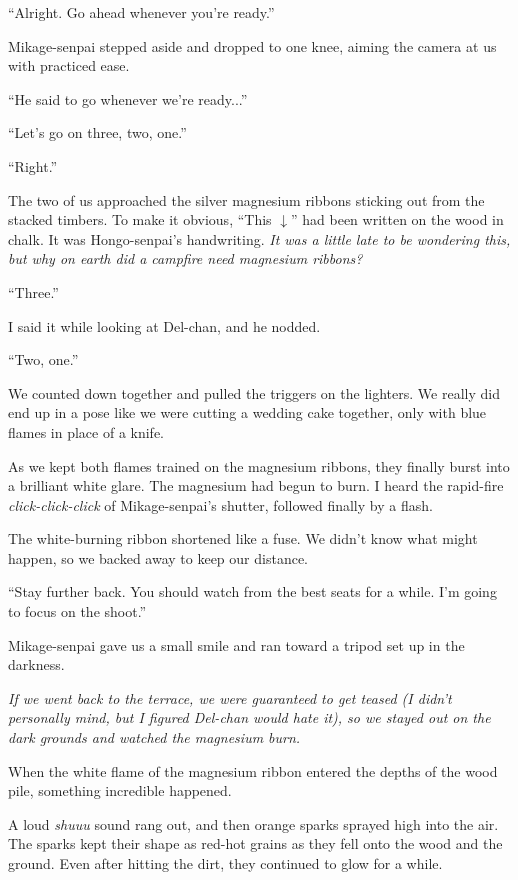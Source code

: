 \documentclass[
    a4paper,
    12pt,
    twoside,
    openany,
    UTF8,
    fontset=windows
]{ctexbook}
\begin{document}
``Alright. Go ahead whenever you're ready.''

Mikage-senpai stepped aside and dropped to one knee, aiming the camera at us with practiced ease.

``He said to go whenever we're ready...''

``Let's go on three, two, one.''

``Right.''

The two of us approached the silver magnesium ribbons sticking out from the stacked timbers. To make it obvious, ``This $\downarrow$'' had been written on the wood in chalk. It was Hongo-senpai's handwriting. \textit{It was a little late to be wondering this, but why on earth did a campfire need magnesium ribbons?}

``Three.''

I said it while looking at Del-chan, and he nodded.

``Two, one.''

We counted down together and pulled the triggers on the lighters. We really did end up in a pose like we were cutting a wedding cake together, only with blue flames in place of a knife.

As we kept both flames trained on the magnesium ribbons, they finally burst into a brilliant white glare. The magnesium had begun to burn. I heard the rapid-fire \textit{click-click-click} of Mikage-senpai's shutter, followed finally by a flash.

The white-burning ribbon shortened like a fuse. We didn't know what might happen, so we backed away to keep our distance.

``Stay further back. You should watch from the best seats for a while. I'm going to focus on the shoot.''

Mikage-senpai gave us a small smile and ran toward a tripod set up in the darkness.

\textit{If we went back to the terrace, we were guaranteed to get teased (I didn't personally mind, but I figured Del-chan would hate it), so we stayed out on the dark grounds and watched the magnesium burn.}

When the white flame of the magnesium ribbon entered the depths of the wood pile, something incredible happened.

A loud \textit{shuuu} sound rang out, and then orange sparks sprayed high into the air. The sparks kept their shape as red-hot grains as they fell onto the wood and the ground. Even after hitting the dirt, they continued to glow for a while.
\end{document}
